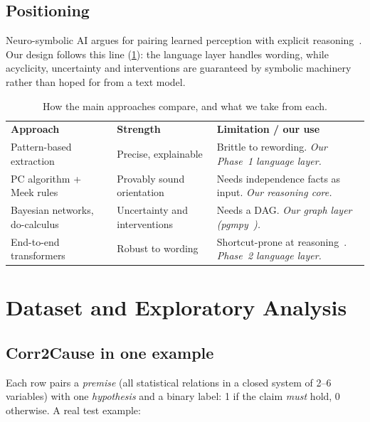 \documentclass[11pt,a4paper]{article}
\newcommand{\thead}[1]{\leavevmode\sffamily\bfseries\color{white}#1}
\newcommand{\headrow}{\rowcolor{ink}}
\begin{document}
\subsection{Positioning}
Neuro-symbolic AI argues for pairing learned perception with explicit reasoning~\cite{garcez2023}. Our design
follows this line (\cref{tab:lit}): the language layer handles wording, while acyclicity, uncertainty and
interventions are guaranteed by symbolic machinery rather than hoped for from a text model.

\begin{table}[!htbp]
\centering\small
\caption{How the main approaches compare, and what we take from each.}
\label{tab:lit}
\begin{tabularx}{\linewidth}{@{}>{\raggedright}p{3.1cm}>{\raggedright}X>{\raggedright\arraybackslash}X@{}}
\headrow \thead{Approach} & \thead{Strength} & \thead{Limitation / our use} \\
Pattern-based extraction~\cite{khoo2000,girju2003} & Precise, explainable & Brittle to rewording. \emph{Our Phase~1 language layer.} \\
\rowcolor{mist} PC algorithm + Meek rules~\cite{spirtes2000,meek1995} & Provably sound orientation & Needs independence facts as input. \emph{Our reasoning core.} \\
Bayesian networks, do-calculus~\cite{pearl1988,pearl2009} & Uncertainty and interventions & Needs a DAG. \emph{Our graph layer (pgmpy~\cite{ankan2015}).} \\
\rowcolor{mist} End-to-end transformers~\cite{devlin2019,sanh2019} & Robust to wording & Shortcut-prone at reasoning~\cite{jin2024corr2cause}. \emph{Phase~2 language layer.} \\
\end{tabularx}
\end{table}

\section{Dataset and Exploratory Analysis}\label{sec:data}

\subsection{Corr2Cause in one example}
Each row pairs a \emph{premise} (all statistical relations in a closed system of 2--6 variables) with one
\emph{hypothesis} and a binary label: 1 if the claim \emph{must} hold, 0 otherwise. A real test example:
\end{document}
